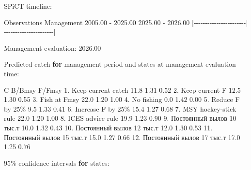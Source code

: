 \documentclass[
  letterpaper,
  DIV=11,
  numbers=noendperiod]{scrreprt}
\newenvironment{Shaded}{\begin{snugshade}}{\end{snugshade}}
\newcommand{\ControlFlowTok}[1]{\textcolor[rgb]{0.00,0.23,0.31}{\textbf{#1}}}
\newcommand{\DecValTok}[1]{\textcolor[rgb]{0.68,0.00,0.00}{#1}}
\newcommand{\ErrorTok}[1]{\textcolor[rgb]{0.68,0.00,0.00}{#1}}
\newcommand{\FloatTok}[1]{\textcolor[rgb]{0.68,0.00,0.00}{#1}}
\newcommand{\NormalTok}[1]{\textcolor[rgb]{0.00,0.23,0.31}{#1}}
\newcommand{\SpecialCharTok}[1]{\textcolor[rgb]{0.37,0.37,0.37}{#1}}
\begin{document}
\begin{Shaded}
\begin{Highlighting}[]
\NormalTok{SPiCT timeline}\SpecialCharTok{:}
                                                  
\NormalTok{      Observations              Management        }
    \FloatTok{2005.00} \SpecialCharTok{{-}} \FloatTok{2025.00}        \FloatTok{2025.00} \SpecialCharTok{{-}} \FloatTok{2026.00}    
 \SpecialCharTok{|{-}{-}{-}{-}{-}{-}{-}{-}{-}{-}{-}{-}{-}{-}{-}{-}{-}{-}{-}{-}{-}{-}{-}}\ErrorTok{|} \SpecialCharTok{{-}{-}{-}{-}{-}{-}{-}{-}{-}{-}{-}{-}{-}{-}{-}{-}{-}{-}{-}{-}{-}{-}}\ErrorTok{|}

\NormalTok{Management evaluation}\SpecialCharTok{:} \FloatTok{2026.00}

\NormalTok{Predicted catch }\ControlFlowTok{for}\NormalTok{ management period and states at management evaluation time}\SpecialCharTok{:}

\NormalTok{                                 C B}\SpecialCharTok{/}\NormalTok{Bmsy F}\SpecialCharTok{/}\NormalTok{Fmsy}
\FloatTok{1.}\NormalTok{ Keep current catch         }\FloatTok{11.8}   \FloatTok{1.31}   \FloatTok{0.52}
\FloatTok{2.}\NormalTok{ Keep current F             }\FloatTok{12.5}   \FloatTok{1.30}   \FloatTok{0.55}
\FloatTok{3.}\NormalTok{ Fish at Fmsy               }\FloatTok{22.0}   \FloatTok{1.20}   \FloatTok{1.00}
\FloatTok{4.}\NormalTok{ No fishing                  }\FloatTok{0.0}   \FloatTok{1.42}   \FloatTok{0.00}
\FloatTok{5.}\NormalTok{ Reduce F by }\DecValTok{25}\NormalTok{\%             }\FloatTok{9.5}   \FloatTok{1.33}   \FloatTok{0.41}
\FloatTok{6.}\NormalTok{ Increase F by }\DecValTok{25}\NormalTok{\%          }\FloatTok{15.4}   \FloatTok{1.27}   \FloatTok{0.68}
\FloatTok{7.}\NormalTok{ MSY hockey}\SpecialCharTok{{-}}\NormalTok{stick rule      }\FloatTok{22.0}   \FloatTok{1.20}   \FloatTok{1.00}
\FloatTok{8.}\NormalTok{ ICES advice rule           }\FloatTok{19.9}   \FloatTok{1.23}   \FloatTok{0.90}
\FloatTok{9.}\NormalTok{ Постоянный вылов }\DecValTok{10}\NormalTok{ тыс.т  }\FloatTok{10.0}   \FloatTok{1.32}   \FloatTok{0.43}
\FloatTok{10.}\NormalTok{ Постоянный вылов }\DecValTok{12}\NormalTok{ тыс.т }\FloatTok{12.0}   \FloatTok{1.30}   \FloatTok{0.53}
\FloatTok{11.}\NormalTok{ Постоянный вылов }\DecValTok{15}\NormalTok{ тыс.т }\FloatTok{15.0}   \FloatTok{1.27}   \FloatTok{0.66}
\FloatTok{12.}\NormalTok{ Постоянный вылов }\DecValTok{17}\NormalTok{ тыс.т }\FloatTok{17.0}   \FloatTok{1.25}   \FloatTok{0.76}

\DecValTok{95}\NormalTok{\% confidence intervals }\ControlFlowTok{for}\NormalTok{ states}\SpecialCharTok{:}


\end{Highlighting}
\end{Shaded}
\end{document}
